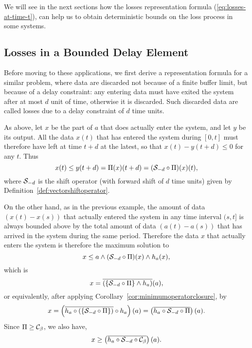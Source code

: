 We will see in the next sections how %
the losses representation formula (\ref{eq:losses-at-time-t}), can help us to obtain deterministic bounds on the loss process in some systems.

\subsection{Losses in a Bounded Delay Element}

Before moving to these applications, we first derive a representation formula
for a similar problem, where data are discarded not because of a  finite buffer limit,
but because of a delay constraint: any entering data must
have exited the system after
at most $d$ unit of time, otherwise it is discarded. Such discarded
data are called losses due to
a delay constraint of $d$ time units.

As above, let $x$ be the part of $a$ that does actually enter the
system, and let $y$ be its output. All the data
$x(t)$ that has entered
the system during $[0,t]$ must therefore have left at time $t+d$ at
the latest, so that
$x(t) - y(t+d) \leq 0$ for any $t$. Thus
\begin{equation}
\mylabel{eq:lossdelayeq1}
x(t) \leq y(t+d) = \Pi(x)(t+d) = (\calS_{-d} \circ \Pi)(x)(t),
\end{equation}
where
$\mathcal S_{-d}$ is the shift operator (with forward shift of $d$ time units)
given by Definition~\ref{def:vectorshiftoperator}.

On the other hand, as in the previous example,
the amount of data $(x(t) - x(s))$ that actually
entered the system in any time interval $(s,t]$ is always
bounded above by the total amount of data $(a(t) - a(s))$
that has arrived in the system during the same period. Therefore
the data $x$ that actually enters the system is therefore the maximum
solution to
\begin{equation}
\mylabel{eq:lossdelayeq3}
x \leq a \wedge (\calS_{-d} \circ \Pi)(x)  \wedge h_{a}(x),
\end{equation}
which is
$$x = \overline{ \left( \left\{ \mathcal S_{-d} \circ \Pi \right\}  \wedge h_{a} \right) } (a), $$
or equivalently, after applying Corollary~\ref{cor:minimumoperatorclosure}, by
\begin{equation}
\mylabel{eq:closure-delayloss-eq}
x = \left( \overline{  h_{a} \circ \left( \{\calS_{-d} \circ \Pi \} \right)}  \circ h_{a} \right) (a) = \left( \overline{ h_{a} \circ \calS_{-d} \circ \Pi} \right) (a).
\end{equation}
Since $\Pi \geq \mathcal C_{\beta}$, we also have,
\begin{equation}
\mylabel{eq:closure-lossdelay-ineq}
x \geq   \left( \overline{  h_{a} \circ \calS_{-d} \circ \calC_{\beta} } \right)(a).
\end{equation}

